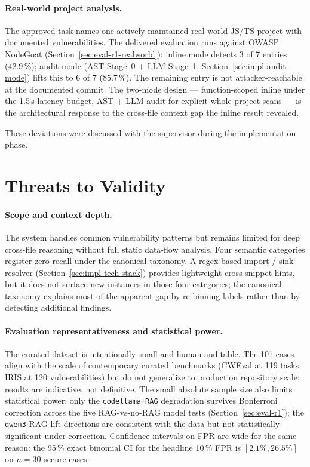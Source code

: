 \paragraph{Real-world project analysis.}
The approved task names one actively maintained real-world JS/TS project with documented vulnerabilities. The delivered evaluation runs against OWASP NodeGoat (Section~\ref{sec:eval-r1-realworld}): inline mode detects 3 of 7 entries (42.9\,\%); audit mode (AST Stage~0 + LLM Stage~1, Section~\ref{sec:impl-audit-mode}) lifts this to 6 of 7 (85.7\,\%). The remaining entry is not attacker-reachable at the documented commit. The two-mode design --- function-scoped inline under the 1.5\,s latency budget, AST + LLM audit for explicit whole-project scans --- is the architectural response to the cross-file context gap the inline result revealed.

These deviations were discussed with the supervisor during the implementation phase.

\section{Threats to Validity}

\paragraph{Scope and context depth.}
The system handles common vulnerability patterns but remains limited for deep cross-file reasoning without full static data-flow analysis. Four semantic categories register zero recall under the canonical taxonomy. A regex-based import / sink resolver (Section~\ref{sec:impl-tech-stack}) provides lightweight cross-snippet hints, but it does not surface new instances in those four categories; the canonical taxonomy explains most of the apparent gap by re-binning labels rather than by detecting additional findings.

\paragraph{Evaluation representativeness and statistical power.}
The curated dataset is intentionally small and human-auditable. The 101 cases align with the scale of contemporary curated benchmarks (CWEval at 119 tasks, IRIS at 120 vulnerabilities) but do not generalize to production repository scale; results are indicative, not definitive. The small absolute sample size also limits statistical power: only the \texttt{codellama+RAG} degradation survives Bonferroni correction across the five RAG-vs-no-RAG model tests (Section~\ref{sec:eval-r1}); the \texttt{qwen3} RAG-lift directions are consistent with the data but not statistically significant under correction. Confidence intervals on FPR are wide for the same reason: the 95\,\% exact binomial CI for the headline 10\,\% FPR is $[2.1\%, 26.5\%]$ on $n=30$ secure cases.

